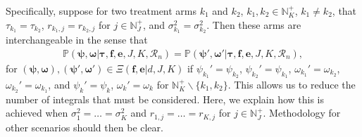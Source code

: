 \documentclass{article}
\numberwithin{equation}{section}
\theoremstyle{plain}
\begin{document}
Specifically, suppose for two treatment arms $k_1$ and $k_2$, $k_1,k_2\in\mathbb{N}_K^+$, $k_1\neq k_2$, that $\tau_{k_1}=\tau_{k_2}$, $r_{k_1,j}=r_{k_2,j}$ for $j\in\mathbb{N}_J^+$, and $\sigma_{k_1}^2=\sigma_{k_2}^2$. Then these arms are interchangeable in the sense that
\begin{align*}
\mathbb{P}(\boldsymbol{\psi},\boldsymbol{\omega}|\boldsymbol{\tau},\boldsymbol{f},\boldsymbol{e},J,K,\mathscr{R}_n)=\mathbb{P}(\boldsymbol{\psi}',\boldsymbol{\omega}'|\boldsymbol{\tau},\boldsymbol{f},\boldsymbol{e},J,K,\mathscr{R}_n),
\end{align*}
for $(\boldsymbol{\psi},\boldsymbol{\omega}),(\boldsymbol{\psi}',\boldsymbol{\omega}')\in\Xi(\boldsymbol{f},\boldsymbol{e}|d,J,K)$ if $\psi_{k_1}'=\psi_{k_2}$, $\psi_{k_2}'=\psi_{k_1}$, $\omega_{k_1}'=\omega_{k_2}$, $\omega_{k_2}'=\omega_{k_1}$, and $\psi_k'=\psi_k$, $\omega_k'=\omega_k$ for $\mathbb{N}_K^+\backslash\{k_1,k_2\}$. This allows us to reduce the number of integrals that must be considered. Here, we explain how this is achieved when $\sigma_1^2=\dots=\sigma_K^2$ and $r_{1,j}=\dots=r_{K,j}$ for $j\in\mathbb{N}_J^+$. Methodology for other scenarios should then be clear.
\end{document}
